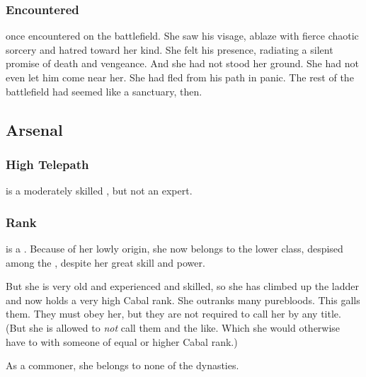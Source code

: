 \subsubsection{Encountered \Ishnaruchaefir}
\Achsah once encountered \Ishnaruchaefir on the battlefield. 
She saw his visage, ablaze with fierce chaotic sorcery and hatred toward her kind. 
She felt his presence, radiating a silent promise of death and vengeance. 
And she had not stood her ground. 
She had not even let him come near her. 
She had fled from his path in panic. 
The rest of the battlefield had seemed like a sanctuary, then. 










\subsection{Arsenal}





\subsubsection{High Telepath}
\Achsah{} is a moderately skilled , but not an expert. 





\subsubsection{Rank}
\Achsah{} is a \bezed{}. 
Because of her lowly origin, she now belongs to the lower class, despised among the \resphain, despite her great skill and power. 

But she is very old and experienced and skilled, so she has climbed up the ladder and now holds a very high Cabal rank. 
She outranks many purebloods. 
This galls them. 
They must obey her, but they are not required to call her by any title. 
(But she is allowed to \emph{not} call them  and the like. Which she would otherwise have to with someone of equal or higher Cabal rank.)

As a commoner, she belongs to none of the \resphan{} dynasties. 









